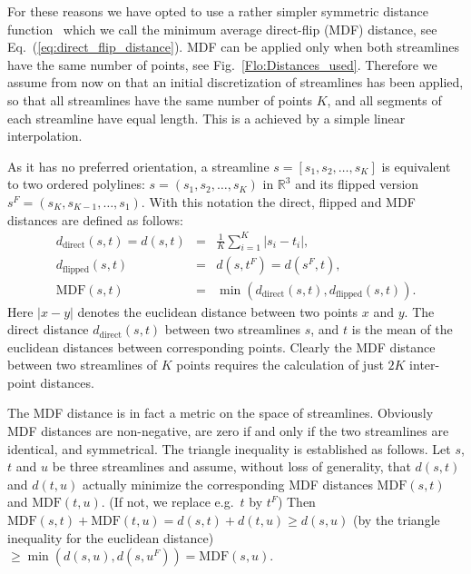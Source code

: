 \documentclass{bioinfo}
\begin{document}
\begin{methods}
For these reasons we have opted to use a rather simpler symmetric
distance function~\citep{EGMB10, Visser2010} which we call the minimum
average direct-flip (MDF) distance, see
Eq.~(\ref{eq:direct_flip_distance}). MDF can be applied only when both
streamlines have the same number of points, see
Fig.~\ref{Flo:Distances_used}. Therefore we assume from now on that an initial
discretization of streamlines has been applied, so that all streamlines
have the same number of points $K$, and all segments of
each streamline have equal length. This is a achieved by a simple linear interpolation.

As it has no preferred orientation, a streamline $s=[s_1, s_2, \ldots, s_K]$ is equivalent to
two ordered polylines: $s = (s_1, s_2, \ldots, s_K)$ in $\mathbb{R}^3$
and its flipped version $s^F = (s_K, s_{K-1}, \ldots, s_1)$.  With this
notation the direct, flipped and MDF distances are defined as follows:
\begin{eqnarray}
  d_{\textrm{direct}}(s, t) = d(s, t) & = & \frac{1}{K}\sum_{i=1}^{K}|s_{i}-t_{i}|,\nonumber\\
  d_{\textrm{flipped}}(s, t) & = & d(s,t^F) = d(s^F,t),\nonumber\\
  \textrm{MDF}(s, t) & = & \min(d_{\textrm{direct}}(s, t), d_{\textrm{flipped}}(s, t))\label{eq:direct_flip_distance}.
\end{eqnarray}
\noindent
Here $|x-y|$ denotes the euclidean distance between two points $x$ and
$y$. The direct distance $d_{\mathrm{direct}}(s, t)$ between two
streamlines $s$, and $t$ is the mean of the euclidean distances between
corresponding points. Clearly the MDF distance between two streamlines
of $K$ points requires the calculation of just $2K$ inter-point
distances.

The MDF distance is in fact a metric on the space of streamlines.
Obviously MDF distances are non-negative, are zero if and only if the
two streamlines are identical, and symmetrical.  The triangle inequality
is established as follows. Let $s$, $t$ and $u$ be three streamlines
and assume, without loss of generality, that $d(s,t)$ and $d(t,u)$ actually
minimize the corresponding MDF distances $\mathrm{MDF}(s,t)$ and
$\mathrm{MDF}(t,u)$. (If not, we replace e.g.~$t$ by $t^F$) Then
$\mathrm{MDF}(s, t) + \mathrm{MDF}(t, u) = d(s, t) + d(t, u) \ge d(s,
u)$ (by the triangle inequality for the euclidean distance) $ \ge
\min(d(s,u), d(s, u^F)) = \mathrm{MDF}(s, u)$.


\end{methods}
\end{document}
